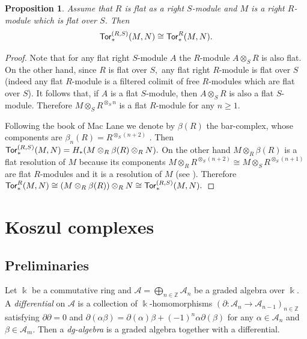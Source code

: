\documentclass{amsart}
\numberwithin{equation}{section}
\newtheorem{proposition}[theorem]{Proposition}
\theoremstyle{definition}
\def\kk{\Bbbk}
\def\ZZ{\mathbb{Z}}
\begin{document}
\begin{proposition} \label{prop_tor_rel-ord}
Assume that $R$ is flat as a right $S$-module and $M$ is a right $R$-module which is flat over $S$. Then 
$${\sf Tor}^{(R,S)}_*(M,N)\cong {\sf Tor}^{R}_*(M,N).$$
\end{proposition}
\begin{proof} Note that for any flat right $S$-module $A$ the $R$-module $A\otimes_S R$ is also flat. On the other hand, since $R$ is flat over $S,$ any flat right $R$-module is flat over $S$ (indeed any flat $R$-module is a filtered colimit of free $R$-modules which are flat over $S$). It follows that, if $A$ is a flat $S$-module, then $A\otimes_S R$ is also a flat $S$-module. Therefore  $M\otimes_SR^{\otimes_S n}$ is a flat $R$-module for any $n\geq 1$.

Following the book of Mac Lane we denote by $\beta(R)$ the bar-complex, whose components are $\beta_n(R)=R^{\otimes_S (n+2)}$ \cite[Ch.IX, Th.8.1]{maclane2012homology}.  Then ${\sf Tor}^{(R,S)}_*(M,N)=H_*(M\otimes_R \beta(R)\otimes_R N).$ On the other hand $M\otimes_R \beta(R) $ is a flat resolution of $M$ because its components $M\otimes_R R^{\otimes_S (n+2)} \cong M\otimes_S R^{\otimes_S (n+1)}$ are flat $R$-modules and it is a resolution of $M$  (see \cite[Ch.IX, Cor.8.2]{maclane2012homology}). Therefore ${\sf Tor}^R_*(M,N)\cong (M\otimes_R \beta(R))\otimes_R N\cong {\sf Tor}^{(R,S)}_*(M,N).$
\end{proof}






\section{Koszul complexes}\label{section_Koszul}
 

\subsection{Preliminaries}
Let $\kk$ be a commutative ring and $\mathcal A=\bigoplus_{n\in  \ZZ} \mathcal A_n $ be a graded algebra over $\kk$. A {\it differential} on $\mathcal A$ is a collection of $\kk$-homomorphisms  $(\partial : \mathcal A_n\to\mathcal A_{n-1})_{n\in \ZZ}$ satisfying $\partial \partial=0$ and $\partial(\alpha\beta)=\partial (\alpha)\beta + (-1)^n\alpha\partial (\beta) $ for any $\alpha\in\mathcal  A_n$ and $\beta\in \mathcal A_m.$ Then a \emph{dg-algebra} is a graded algebra together with a differential.
\end{document}
